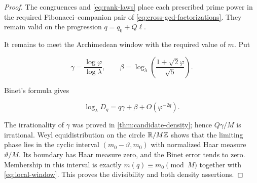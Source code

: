 \begin{proof}
The congruences and \cref{eq:rank-laws} place each prescribed prime power in
the required Fibonacci--companion pair of
\cref{eq:cross-gcd-factorizations}. They remain valid on the progression
$q=q_0+Q\ell$.

It remains to meet the Archimedean window with the required value of $m$.
Put

\begin{equation}
 \gamma=\frac{\log\varphi}{\log\lambda},
 \qquad
 \beta=\log_\lambda\left(\frac{1+\sqrt2\varphi}{\sqrt5}\right).
\end{equation}

Binet's formula gives

\begin{equation}
 \log_\lambda D_q=q\gamma+\beta+O(\varphi^{-2q}).
 \label{eq:local-rotation}
\end{equation}

The irrationality of $\gamma$ was proved in
\cref{thm:candidate-density}; hence $Q\gamma/M$ is irrational. Weyl
equidistribution on the circle $\mathbb{R}/M\mathbb{Z}$ shows that the limiting phase lies
in the cyclic interval $(m_0-\vartheta,m_0)$ with normalized Haar measure
$\vartheta/M$. Its boundary has Haar measure zero, and the Binet error tends
to zero. Membership in this interval is exactly
$m(q)\equiv m_0\pmod M$ together with \cref{eq:local-window}. This proves
the divisibility and both density assertions.
\end{proof}

